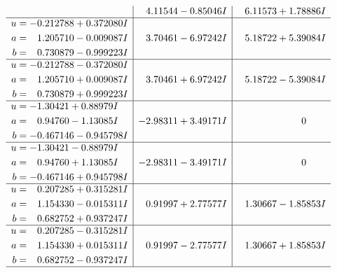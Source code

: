 \documentclass[1p]{elsarticle_modified}
\theoremstyle{definition}
\begin{document}
$$\begin{array}{c|c|c}
 & \phantom{-}4.11544 - 0.85046 I & \phantom{-}6.11573 + 1.78886 I \\ \hline\begin{aligned}
u &= -0.212788 + 0.372080 I \\
a &= \phantom{-}1.205710 - 0.009087 I \\
b &= \phantom{-}0.730879 - 0.999223 I\end{aligned}
 & \phantom{-}3.70461 - 6.97242 I & \phantom{-}5.18722 + 5.39084 I \\ \hline\begin{aligned}
u &= -0.212788 - 0.372080 I \\
a &= \phantom{-}1.205710 + 0.009087 I \\
b &= \phantom{-}0.730879 + 0.999223 I\end{aligned}
 & \phantom{-}3.70461 + 6.97242 I & \phantom{-}5.18722 - 5.39084 I \\ \hline\begin{aligned}
u &= -1.30421 + 0.88979 I \\
a &= \phantom{-}0.94760 - 1.13085 I \\
b &= -0.467146 - 0.945798 I\end{aligned}
 & -2.98311 + 3.49171 I & \phantom{-0.000000 } 0 \\ \hline\begin{aligned}
u &= -1.30421 - 0.88979 I \\
a &= \phantom{-}0.94760 + 1.13085 I \\
b &= -0.467146 + 0.945798 I\end{aligned}
 & -2.98311 - 3.49171 I & \phantom{-0.000000 } 0 \\ \hline\begin{aligned}
u &= \phantom{-}0.207285 + 0.315281 I \\
a &= \phantom{-}1.154330 - 0.015311 I \\
b &= \phantom{-}0.682752 + 0.937247 I\end{aligned}
 & \phantom{-}0.91997 + 2.77577 I & \phantom{-}1.30667 - 1.85853 I \\ \hline\begin{aligned}
u &= \phantom{-}0.207285 - 0.315281 I \\
a &= \phantom{-}1.154330 + 0.015311 I \\
b &= \phantom{-}0.682752 - 0.937247 I\end{aligned}
 & \phantom{-}0.91997 - 2.77577 I & \phantom{-}1.30667 + 1.85853 I\\
 \hline 
 \end{array}$$\newpage$$\begin{array}{c|c|c}  

\end{array}$$
\end{document}
